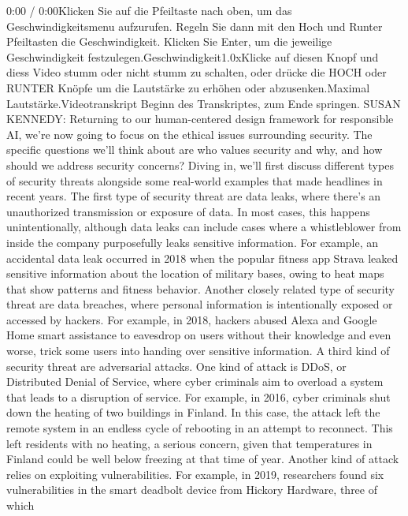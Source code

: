    0:00 / 0:00Klicken Sie auf die Pfeiltaste nach oben, um das Geschwindigkeitsmenu aufzurufen. Regeln Sie dann mit den Hoch und Runter Pfeiltasten die Geschwindigkeit. Klicken Sie Enter, um die jeweilige Geschwindigkeit festzulegen.Geschwindigkeit1.0xKlicke auf diesen Knopf und diess Video stumm oder nicht stumm zu schalten, oder drücke die HOCH oder RUNTER Knöpfe um die Lautstärke zu erhöhen oder abzusenken.Maximal Lautstärke.Videotranskript
    Beginn des Transkriptes, zum Ende springen.
    SUSAN KENNEDY: Returning to our human-centered design
    framework for responsible AI, we're now going
    to focus on the ethical issues surrounding security.
    The specific questions we'll think about are who values security and why,
    and how should we address security concerns?
    Diving in, we'll first discuss different types of security threats
    alongside some real-world examples that made headlines in recent years.
    The first type of security threat are data leaks,
    where there's an unauthorized transmission or exposure of data.
    In most cases, this happens unintentionally,
    although data leaks can include cases where
    a whistleblower from inside the company purposefully
    leaks sensitive information.
    For example, an accidental data leak occurred in 2018
    when the popular fitness app Strava leaked sensitive information
    about the location of military bases, owing to heat maps that
    show patterns and fitness behavior.
    Another closely related type of security threat
    are data breaches, where personal information is intentionally
    exposed or accessed by hackers.
    For example, in 2018, hackers abused Alexa and Google Home smart assistance
    to eavesdrop on users without their knowledge
    and even worse, trick some users into handing over sensitive information.
    A third kind of security threat are adversarial attacks.
    One kind of attack is DDoS, or Distributed Denial
    of Service, where cyber criminals aim to overload a system that
    leads to a disruption of service.
    For example, in 2016, cyber criminals shut down the heating of two buildings
    in Finland.
    In this case, the attack left the remote system
    in an endless cycle of rebooting in an attempt to reconnect.
    This left residents with no heating, a serious concern,
    given that temperatures in Finland could be well below freezing
    at that time of year.
    Another kind of attack relies on exploiting vulnerabilities.
    For example, in 2019, researchers found six vulnerabilities
    in the smart deadbolt device from Hickory Hardware, three of which
